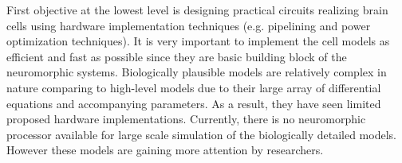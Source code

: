 \documentclass[12pt,oneside]{book}
\begin{document}
  First objective at the lowest  level is designing practical circuits realizing brain cells using hardware implementation techniques (e.g. pipelining and power optimization techniques).  It is very important to implement the cell
models as efficient and fast as possible since they are basic building block of the neuromorphic systems. 
Biologically plausible models are  relatively complex in nature comparing to high-level models due to their large array of differential equations and accompanying parameters.
As a result, they have  seen limited
proposed hardware implementations. Currently, there is no neuromorphic processor available for large scale simulation of the biologically detailed models. 
 However these models are gaining
more attention by researchers. 
\end{document}
